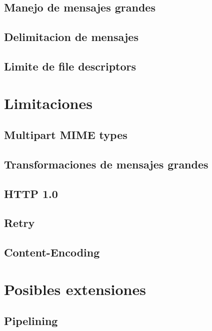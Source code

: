 \documentclass[11pt,a4paper,titlepage]{article}
\begin{document}
    \subsection{Manejo de mensajes grandes}

    \subsection{Delimitacion de mensajes}

    \subsection{Limite de file descriptors}

\section{Limitaciones}
    \subsection{Multipart MIME types}

    \subsection{Transformaciones de mensajes grandes}

    \subsection{HTTP 1.0}

    \subsection{Retry}

    \subsection{Content-Encoding}


\section{Posibles extensiones}
    \subsection{Pipelining}
\end{document}

